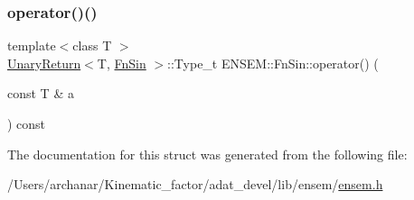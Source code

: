 \mbox{\label{structENSEM_1_1FnSin_aa82ed3f0ebd57960c04e240acba9184b}} 
\subsubsection{\texorpdfstring{operator()()}{operator()()}\hspace{0.1cm}{\footnotesize\ttfamily [2/2]}}
{\footnotesize\ttfamily template$<$class T $>$ \\
\mbox{\hyperlink{structENSEM_1_1UnaryReturn}{Unary\+Return}}$<$T, \mbox{\hyperlink{structENSEM_1_1FnSin}{Fn\+Sin}} $>$\+::Type\+\_\+t E\+N\+S\+E\+M\+::\+Fn\+Sin\+::operator() (\begin{DoxyParamCaption}\item[{const T \&}]{a }\end{DoxyParamCaption}) const\hspace{0.3cm}{\ttfamily [inline]}}



The documentation for this struct was generated from the following file\+:\begin{DoxyCompactItemize}
\item 
/\+Users/archanar/\+Kinematic\+\_\+factor/adat\+\_\+devel/lib/ensem/\mbox{\hyperlink{lib_2ensem_2ensem_8h}{ensem.\+h}}\end{DoxyCompactItemize}
